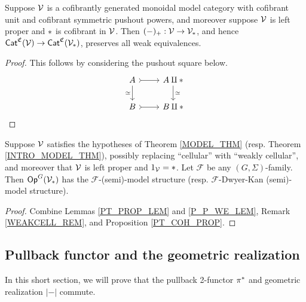 \documentclass[a4paper,10pt
,draft
]{article}%
\renewcommand{\F}{\mathcal F}
\renewcommand{\1}{\eta}%
\begin{document}
{  \begin{lemma}
        \label{P_P_WE_LEM}
        Suppose $\mathcal V$ is a cofibrantly generated monoidal model category with cofibrant unit and cofibrant symmetric pushout powers,
        and moreover suppose $\mathcal V$ is left proper and $\**$ is cofibrant in $\mathcal V$.
        Then $(-)_+: \V \to \V_{\**}$, and hence $\Cat^{\mathfrak C}(\V) \to \Cat^{\mathfrak C}(\V_{\**})$, preserves all weak equivalences.
  \end{lemma}
  \begin{proof}
        This follows by considering the pushout square below.
        \begin{equation}
              \begin{tikzcd}
                    A \arrow[r, rightarrowtail] \arrow[d, "\simeq"']
                    &
                    A \amalg \** \arrow[d, "\simeq"]
                    \\
                    B \arrow[r, rightarrowtail]
                    &
                    B \amalg \**
              \end{tikzcd}
        \end{equation}
  \end{proof}

  \begin{corollary}
        \label{PT_MODEL_COR}
        Suppose $\mathcal V$ satisfies the hypotheses of Theorem \ref{MODEL_THM} (resp. Theorem \ref{INTRO_MODEL_THM}),
        possibly replacing ``cellular'' with ``weakly cellular'',
        and moreover that $\mathcal V$ is left proper and $1_\V = \**$.
        Let $\F$ be any $(G, \Sigma)$-family.
        Then $\Op^G(\V_{\**})$ has the $\F$-(semi)-model structure (resp. $\F$-Dwyer-Kan (semi)-model structure).
  \end{corollary}
  \begin{proof}
        Combine Lemmas \ref{PT_PROP_LEM} and \ref{P_P_WE_LEM}, Remark \ref{WEAKCELL_REM}, and Proposition \ref{PT_COH_PROP}.
  \end{proof}

} %


\subsection{Pullback functor and the geometric realization}

In this short section, we will prove that the pullback 2-functor $\pi^{\**}$ and geometric realization $|-|$ commute.
\end{document}
